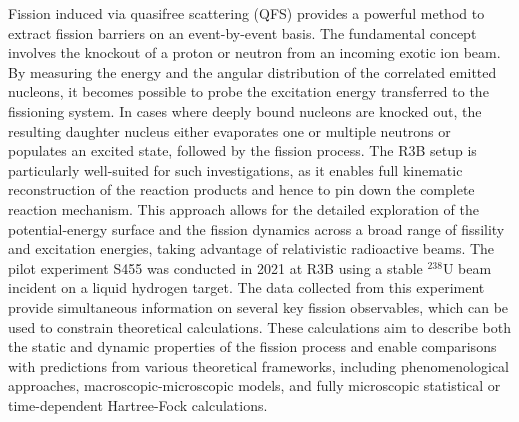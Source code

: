 \begin{description}
\begin{figure}[h!]
{    }
    \label{fig:src_pairs}
\end{figure}
\item[Fission via QFS]Fission induced via quasifree scattering (QFS) provides a powerful method to extract fission barriers on an event-by-event basis. The fundamental concept involves the knockout of a proton or neutron from an incoming exotic ion beam. By measuring the energy  and the angular distribution of the correlated emitted nucleons, it becomes possible to probe the excitation energy transferred to the fissioning system. In cases where deeply bound nucleons are knocked out, the resulting daughter nucleus either evaporates one or multiple neutrons or populates an excited state, followed by the fission process. The R3B setup is particularly well-suited for such investigations, as it enables full kinematic reconstruction of the reaction products and hence to pin down the complete reaction mechanism. This approach allows for the detailed exploration of the potential-energy surface and the fission dynamics across a broad range of fissility and excitation energies, taking advantage of relativistic radioactive beams.\newline
The pilot experiment S455 was conducted in 2021 at R3B using a stable $^{238}$U beam incident on a liquid hydrogen target. The data collected from this experiment provide simultaneous information on several key fission observables, which can be used to constrain theoretical calculations. These calculations aim to describe both the static and dynamic properties of the fission process and enable comparisons with predictions from various theoretical frameworks, including phenomenological approaches, macroscopic-microscopic models, and fully microscopic statistical or time-dependent Hartree-Fock calculations.\newline
\end{description}
\newpage
